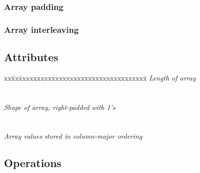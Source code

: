 \subsubsection{Array padding}

\subsubsection{Array interleaving}


\subsection{Attributes}

\begin{tabbing}
xx\=xx\=xxxxxxxxxxxxxxxxxxxxxxxxxxxxxxxxxxx\= \kill
\> \todo \>  \textit{Length of array} \\
\>       \>       \\ \\
\> \todo \>  \textit {Shape of array, right-padded with 1's} \\
\>       \>   \\ \\
\> \todo \>  \textit {Array values stored in column-major ordering}\\
\>       \> 
\end{tabbing}

\subsection{Operations}

